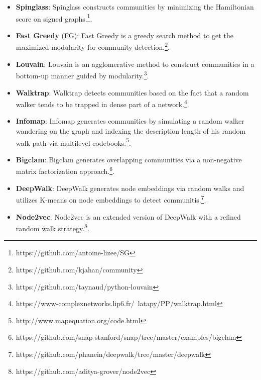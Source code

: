 \begin{itemize}
	\item \textbf{Spinglass}: Spinglass  constructs communities by minimizing the Hamiltonian score on signed graphs.\footnote{https://github.com/antoine-lizee/SG}.
	\item \textbf{Fast Greedy} (FG): Fast Greedy  is a greedy search method to get the maximized modularity for community detection.\footnote{https://github.com/kjahan/community}.
	\item \textbf{Louvain}: Louvain  is an agglomerative method to construct communities in a bottom-up manner guided by modularity.\footnote{https://github.com/taynaud/python-louvain}. 
	\item \textbf{Walktrap}: Walktrap detects communities based on the fact that a random walker tends to be trapped in dense part of a network.\footnote{https://www-complexnetworks.lip6.fr/~latapy/PP/walktrap.html}.
	\item \textbf{Infomap}: Infomap generates communities by simulating a random walker wandering on the graph and indexing the description length of his random walk path via multilevel codebooks.\footnote{http://www.mapequation.org/code.html}.
	\item \textbf{Bigclam}: Bigclam generates overlapping communities via a non-negative matrix factorization approach.\footnote{https://github.com/snap-stanford/snap/tree/master/examples/bigclam}.
	\item \textbf{DeepWalk}: DeepWalk generates node embeddings via random walks and utilizes K-means on node embeddings to detect communitis.\footnote{https://github.com/phanein/deepwalk/tree/master/deepwalk}.
	\item \textbf{Node2vec}: Node2vec is an extended version of DeepWalk with a refined random walk strategy.\footnote{https://github.com/aditya-grover/node2vec}.
\end{itemize}

